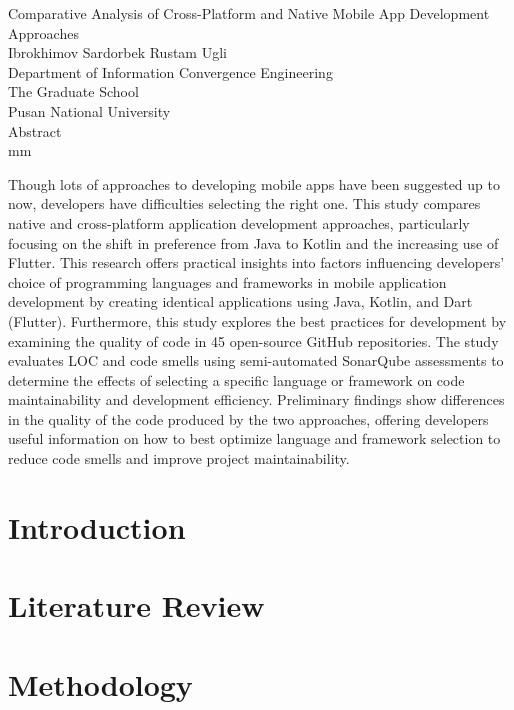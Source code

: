 \documentclass[11pt,jaso]{pnumasterh}
\begin{document}
\newpage
\thispagestyle{empty}
\begin{center}
    \vskip 3.5cm
    {\Large{Comparative Analysis of Cross-Platform and Native Mobile App Development Approaches}} \\
    \vskip 15mm
    {\large{Ibrokhimov Sardorbek Rustam Ugli}} \\
    \vskip 10mm
    {Department of Information Convergence Engineering} \\
    {The Graduate School} \\
    {Pusan National University} \\
    \vskip 15mm
    {\large{Abstract}}\\
     mm
\end{center}
Though lots of approaches to developing mobile apps have been suggested up to now, developers have difficulties selecting the right one. This study compares native and cross-platform application development approaches, particularly focusing on the shift in preference from Java to Kotlin and the increasing use of Flutter. This research offers practical insights into factors influencing developers’ choice of programming languages and frameworks in mobile application development by creating identical applications using Java, Kotlin, and Dart (Flutter). Furthermore, this study explores the best practices for development by examining the quality of code in 45 open-source GitHub repositories. The study evaluates LOC and code smells using semi-automated SonarQube assessments to determine the effects of selecting a specific language or framework on code maintainability and development efficiency. Preliminary findings show differences in the quality of the code produced by the two approaches, offering developers useful information on how to best optimize language and framework selection to reduce code smells and improve project maintainability.    
\newpage
{}

\section{Introduction}

\clearpage

\section{Literature Review} \label{literature_review}

\clearpage

\section{Methodology}
\clearpage
\end{document}
